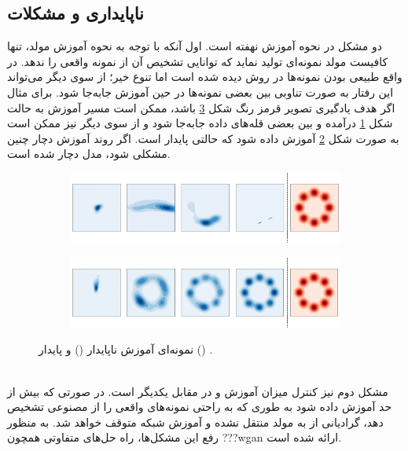  \subsection{ناپایداری و مشکلات \gan{}}
 دو مشکل در نحوه آموزش \gan{} نهفته است. اول آنکه با توجه به نحوه آموزش مولد، تنها کافیست مولد نمونه‌ای تولید نماید که \discriminator{} توانایی تشخیص آن از نمونه واقعی را ندهد. در واقع طبیعی بودن نمونه‌ها در روش دیده شده است اما تنوع خیر؛ از سوی دیگر می‌تواند این رفتار به صورت تناوبی بین بعضی نمونه‌ها در حین آموزش جابه‌جا شود. برای مثال اگر هدف یادگیری تصویر قرمز رنگ شکل \ref{fig:gan_train} باشد، ممکن است مسیر آموزش به حالت شکل \ref{fig:gan_bad_train} درآمده و بین بعضی قله‌های داده جابه‌جا شود و از سوی دیگر نیز ممکن است به صورت شکل \ref{fig:gan_good_train} آموزش داده شود که حالتی پایدار است. اگر روند آموزش دچار چنین مشکلی شود، مدل دچار 
 شده است.
 \begin{figure}[h]
     \centering
     \begin{subfigure}[h]{.7\textwidth}
         \centering
         \includegraphics[width=1.\textwidth]{images/GANBadTrain.pdf}
         \caption{}
         \label{fig:gan_bad_train}
     \end{subfigure}
     \begin{subfigure}[h]{.7\textwidth}
         \centering
         \includegraphics[width=1.\textwidth]{images/GANGoodTrain.pdf}
         \caption{}
         \label{fig:gan_good_train}
     \end{subfigure}
     \caption{
         نمونه‌ای آموزش ناپایدار () و پایدار
         () \gan{}.
     }
  \label{fig:gan_train}
 \end{figure}
 \\
 مشکل دوم نیز کنترل میزان آموزش \discriminator{} و \generator{} در مقابل یکدیگر است. در صورتی که \discriminator{} بیش از حد آموزش داده شود به طوری که به راحتی نمونه‌های واقعی را از مصنوعی تشخیص دهد، گرادیانی از \discriminator{} به مولد منتقل نشده و آموزش شبکه متوقف خواهد شد. به منظور رفع این مشکل‌ها، راه حل‌های متفاوتی همچون ???wgan ارائه شده است.
